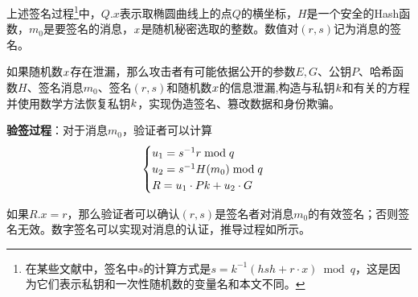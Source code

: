 {	上述签名过程\footnote{在某些文献中，签名中$s$的计算方式是$s=k^{-1}(hsh+r\cdot x)\bmod q$，这是因为它们表示私钥和一次性随机数的变量名和本文不同。}中，$Q.x$表示取椭圆曲线上的点$Q$的横坐标，$H$是一个安全的Hash函数，$m_0$是要签名的消息，$x$是随机秘密选取的整数。数值对$(r,s)$记为消息的签名。
	
	如果随机数$x$存在泄漏，那么攻击者有可能依据公开的参数$E,G$、公钥$P$、哈希函数$H$、签名消息$m_0$、签名$(r,s)$和随机数$x$的信息泄漏,构造与私钥$k$和有关的方程并使用数学方法恢复私钥$k$，实现伪造签名、篡改数据和身份欺骗。
	
	\textbf{验签过程}：对于消息$m_0$，验证者可以计算
	\begin{equation}\label{eq:prepare-verify}
	\begin{cases}
		u_1=s^{-1}r\bmod q\\
		u_2=s^{-1}H(m_0)\bmod q\\
		R=u_1\cdot Pk+u_2\cdot G
	\end{cases}
	\end{equation}
	
	如果$R.x=r$，那么验证者可以确认$(r,s)$是签名者对消息$m_0$的有效签名；否则签名无效。数字签名可以实现对消息的认证，推导过程如所示。
	
}
